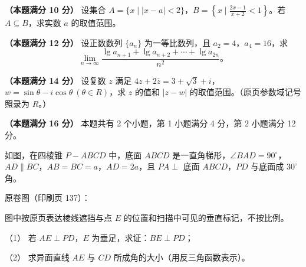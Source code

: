 \begin{question}
\textbf{（本题满分 10 分）} 设集合 $A=\{x\mid |x-a|<2\}$，$B=\left\{x\mid\frac{2x-1}{x+2}<1\right\}$。若 $A\subseteq B$，求实数 $a$ 的取值范围。

\end{question}
\begin{question}
\textbf{（本题满分 12 分）} 设正数数列 $\{a_n\}$ 为一等比数列，且 $a_2=4$，$a_4=16$，求
\nopagebreak[4]
\[
\lim_{n\to\infty}\frac{\lg a_{n+1}+\lg a_{n+2}+\cdots+\lg a_{2n}}{n^2}\mbox{。}
\]

\end{question}
\begin{question}
\textbf{（本题满分 14 分）} 设复数 $z$ 满足 $4z+2\bar z=3+\sqrt3+i$，$w=\sin\theta-i\cos\theta\ (\theta\in R)$，求 $z$ 的值和 $|z-w|$ 的取值范围。（原页参数域记号照录为 $R$。）

\Needspace{0.4\textheight}
\end{question}
\begin{question}
\textbf{（本题满分 16 分）} 本题共有 2 个小题，第 1 小题满分 4 分，第 2 小题满分 12 分。

如图，在四棱锥 $P-ABCD$ 中，底面 $ABCD$ 是一直角梯形，$\angle BAD=90^\circ$，$AD\parallel BC$，$AB=BC=a$，$AD=2a$，且 $PA\perp$ 底面 $ABCD$，$PD$ 与底面成 $30^\circ$ 角。

原卷图（印刷页 137）：
\nopagebreak[4]
\begin{center}\end{center}
\nopagebreak[4]
图中按原页表达棱线遮挡与点 $E$ 的位置和扫描中可见的垂直标记，不按比例。

（1） 若 $AE\perp PD$，$E$ 为垂足，求证：$BE\perp PD$；

（2） 求异面直线 $AE$ 与 $CD$ 所成角的大小（用反三角函数表示）。

\Needspace{0.4\textheight}
\end{question}
